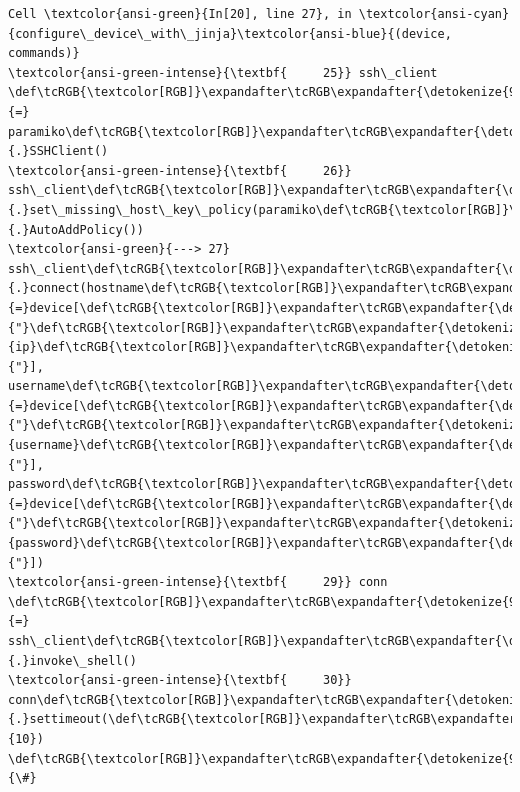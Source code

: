\documentclass[11pt]{article}
\begin{document}
\begin{Verbatim}[commandchars=\\\{\}, frame=single, framerule=2mm, rulecolor=\color{outerrorbackground}]
Cell \textcolor{ansi-green}{In[20], line 27}, in \textcolor{ansi-cyan}{configure\_device\_with\_jinja}\textcolor{ansi-blue}{(device, commands)}
\textcolor{ansi-green-intense}{\textbf{     25}} ssh\_client \def\tcRGB{\textcolor[RGB]}\expandafter\tcRGB\expandafter{\detokenize{98,98,98}}{=} paramiko\def\tcRGB{\textcolor[RGB]}\expandafter\tcRGB\expandafter{\detokenize{98,98,98}}{.}SSHClient()
\textcolor{ansi-green-intense}{\textbf{     26}} ssh\_client\def\tcRGB{\textcolor[RGB]}\expandafter\tcRGB\expandafter{\detokenize{98,98,98}}{.}set\_missing\_host\_key\_policy(paramiko\def\tcRGB{\textcolor[RGB]}\expandafter\tcRGB\expandafter{\detokenize{98,98,98}}{.}AutoAddPolicy())
\textcolor{ansi-green}{---> 27} ssh\_client\def\tcRGB{\textcolor[RGB]}\expandafter\tcRGB\expandafter{\detokenize{98,98,98}}{.}connect(hostname\def\tcRGB{\textcolor[RGB]}\expandafter\tcRGB\expandafter{\detokenize{98,98,98}}{=}device[\def\tcRGB{\textcolor[RGB]}\expandafter\tcRGB\expandafter{\detokenize{175,0,0}}{"}\def\tcRGB{\textcolor[RGB]}\expandafter\tcRGB\expandafter{\detokenize{175,0,0}}{ip}\def\tcRGB{\textcolor[RGB]}\expandafter\tcRGB\expandafter{\detokenize{175,0,0}}{"}], username\def\tcRGB{\textcolor[RGB]}\expandafter\tcRGB\expandafter{\detokenize{98,98,98}}{=}device[\def\tcRGB{\textcolor[RGB]}\expandafter\tcRGB\expandafter{\detokenize{175,0,0}}{"}\def\tcRGB{\textcolor[RGB]}\expandafter\tcRGB\expandafter{\detokenize{175,0,0}}{username}\def\tcRGB{\textcolor[RGB]}\expandafter\tcRGB\expandafter{\detokenize{175,0,0}}{"}], password\def\tcRGB{\textcolor[RGB]}\expandafter\tcRGB\expandafter{\detokenize{98,98,98}}{=}device[\def\tcRGB{\textcolor[RGB]}\expandafter\tcRGB\expandafter{\detokenize{175,0,0}}{"}\def\tcRGB{\textcolor[RGB]}\expandafter\tcRGB\expandafter{\detokenize{175,0,0}}{password}\def\tcRGB{\textcolor[RGB]}\expandafter\tcRGB\expandafter{\detokenize{175,0,0}}{"}])
\textcolor{ansi-green-intense}{\textbf{     29}} conn \def\tcRGB{\textcolor[RGB]}\expandafter\tcRGB\expandafter{\detokenize{98,98,98}}{=} ssh\_client\def\tcRGB{\textcolor[RGB]}\expandafter\tcRGB\expandafter{\detokenize{98,98,98}}{.}invoke\_shell()
\textcolor{ansi-green-intense}{\textbf{     30}} conn\def\tcRGB{\textcolor[RGB]}\expandafter\tcRGB\expandafter{\detokenize{98,98,98}}{.}settimeout(\def\tcRGB{\textcolor[RGB]}\expandafter\tcRGB\expandafter{\detokenize{98,98,98}}{10})  \def\tcRGB{\textcolor[RGB]}\expandafter\tcRGB\expandafter{\detokenize{95,135,135}}{\#}


\end{Verbatim}
\end{document}
